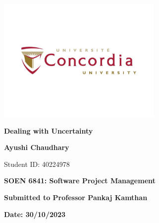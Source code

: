 \documentclass{article}
\begin{document}
\begin{titlepage}
    \centering
    \vspace*{1cm}
    \includegraphics[width=0.6\textwidth]{Logo.jpg} %
    \par\vspace{0.5cm}
    {\Huge\textbf{Dealing with Uncertainty}\par}
    \vspace{1.5cm}
    {\Large\textbf{Ayushi Chaudhary}\par}
    \vspace{0.5cm}
    {Student ID: 40224978\par}
    \vspace{2cm}
    {\Large\textbf{SOEN 6841: Software Project Management}\par}
    \vspace{1cm}
    {\large\textbf{Submitted to Professor Pankaj Kamthan}\par} %
    \vfill
    {\large\textbf{Date: 30/10/2023}\par}
\end{titlepage}

\newpage
\tableofcontents
\newpage
{}
\end{document}
